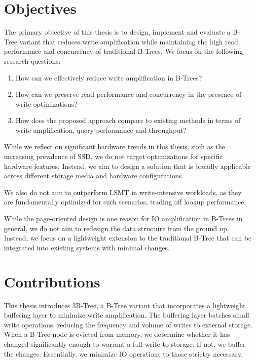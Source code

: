 \section{Objectives}
The primary objective of this thesis is to design, implement and evaluate a B-Tree variant that reduces write amplification while maintaining the high read performance and concurrency of traditional B-Trees.
We focus on the following research questions:
\begin{enumerate}
  \item How can we effectively reduce write amplification in B-Trees?
  \item How can we preserve read performance and concurrency in the presence of write optimizations?
  \item How does the proposed approach compare to existing methods in terms of write amplification, query performance and throughput?
\end{enumerate}

While we reflect on significant hardware trends in this thesis, such as the increasing prevalence of \ac{SSD}, we do not target optimizations for specific hardware features.
Instead, we aim to design a solution that is broadly applicable across different storage media and hardware configurations.

We also do not aim to outperform \ac{LSMT} in write-intensive workloads, as they are fundamentally optimized for such scenarios, trading off lookup performance.

While the page-oriented design is one reason for \ac{IO} amplification in B-Trees in general, we do not aim to redesign the data structure from the ground up.
Instead, we focus on a lightweight extension to the traditional B-Tree that can be integrated into existing systems with minimal changes.

\section{Contributions}
This thesis introduces 3B-Tree, a B-Tree variant that incorporates a lightweight buffering layer to minimize write amplification.
The buffering layer batches small write operations, reducing the frequency and volume of writes to external storage.
When a B-Tree node is evicted from memory, we determine whether it has changed significantly enough to warrant a full write to storage.
If not, we buffer the changes.
Essentially, we minimize \ac{IO} operations to those strictly necessary. 

